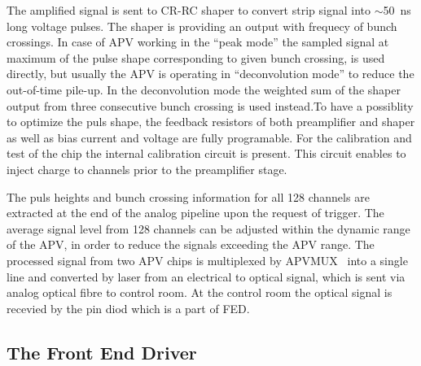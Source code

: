 The amplified signal is sent to CR-RC shaper to convert strip signal into $\sim$50~ns long voltage pulses. The shaper is providing an output with frequecy of bunch crossings. In case of APV working in the ``peak mode'' the sampled signal at maximum of the pulse shape corresponding to given bunch crossing, is used directly, but usually the APV is operating in ``deconvolution mode'' to reduce the out-of-time pile-up. In the deconvolution mode the weighted sum of the shaper output from three consecutive bunch crossing is used instead.To have a possiblity to optimize the puls shape, the feedback resistors of both preamplifier and shaper as well as  bias current and voltage are fully programable. For the calibration and test of the chip the internal calibration circuit is present. This circuit enables to inject charge to channels prior to the preamplifier stage.

The puls heights and bunch crossing information for all 128 channels are extracted at the end of the analog pipeline upon the request of trigger. The average signal level from 128 channels can be adjusted within the dynamic range of the APV, in order to reduce the signals exceeding the APV range. The processed signal from two APV chips is multiplexed by APVMUX~\cite{Ball:2007zza} into a single line and converted by laser from an electrical to optical signal, which is sent via analog optical fibre to control room. At the control room the optical signal is recevied by the pin diod which is a part of FED.



\subsection{The Front End Driver}

